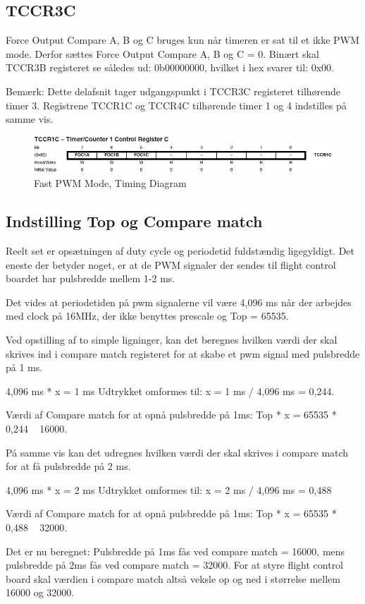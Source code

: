 \subsection*{TCCR3C}
Force Output Compare A, B og C bruges kun når timeren er sat til et ikke PWM mode.  Derfor sættes Force Output Compare A, B og C = 0.
Binært skal TCCR3B registeret se således ud: 0b00000000, hvilket i hex svarer til: 0x00. 

Bemærk: Dette delafsnit tager udgangspunkt i TCCR3C registeret tilhørende timer 3.  Registrene TCCR1C og TCCR4C tilhørende timer 1 og 4 indstilles på samme vis.

\begin{figure}[H]
	\centering
	\includegraphics[width=1.\textwidth]{Billeder/Timer/6_TCCT3C.png}
	\caption{Fast PWM Mode, Timing Diagram}
	\label{fig:Timing_diagram}
\end{figure}
 

\subsection*{Indstilling Top og Compare match}
Reelt set er opsætningen af duty cycle og periodetid fuldstændig ligegyldigt. Det eneste der betyder noget, er at de PWM signaler der sendes til flight control boardet har pulsbredde mellem 1-2 ms.
 
Det vides at periodetiden på pwm signalerne vil være 4,096 ms når der arbejdes med clock på 16MHz, der ikke benyttes prescale og Top = 65535.

Ved opstilling af to simple ligninger, kan det beregnes hvilken værdi der skal skrives ind i compare match registeret for at skabe et pwm signal med pulsbredde på 1 ms.  

4,096 ms * x = 1 ms	Udtrykket omformes til: 	x = 1 ms / 4,096 ms = 0,244.

Værdi af Compare match for at opnå pulsbredde på 1ms:  Top * x = 65535 * 0,244 ~ 16000.

På samme vis kan det udregnes hvilken værdi der skal skrives i compare match for at få pulsbredde på 2 ms.

4,096 ms * x = 2 ms	Udtrykket omformes til: 	x = 2 ms / 4,096 ms = 0,488

Værdi af Compare match for at opnå pulsbredde på 1ms:  Top * x = 65535 * 0,488 ~ 32000.

Det er nu beregnet: Pulsbredde på 1ms fås ved compare match = 16000, mens pulsbredde på 2ms fås ved compare match = 32000. For at styre flight control board skal værdien i compare match altså veksle op og ned i størrelse mellem 16000 og 32000. 






